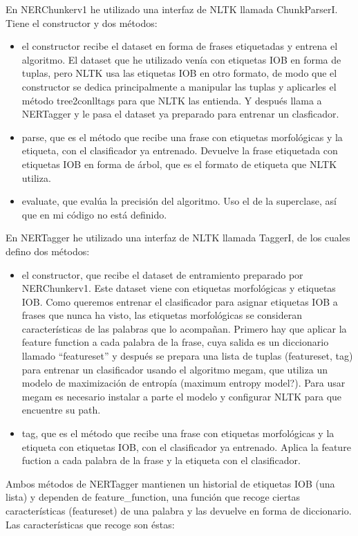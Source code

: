 \documentclass{pre-tfg}
\begin{document}
En NERChunkerv1 he utilizado una interfaz de NLTK llamada ChunkParserI. Tiene el constructor y dos métodos:
\begin{itemize}
	\item el constructor recibe el dataset en forma de frases etiquetadas y entrena el algoritmo. El dataset que he utilizado venía con etiquetas IOB en forma de tuplas, pero NLTK usa las etiquetas IOB en otro formato, de modo que el constructor se dedica principalmente a manipular las tuplas y aplicarles el método tree2conlltags para que NLTK las entienda. Y después llama a NERTagger y le pasa el dataset ya preparado para entrenar un clasficador.
	\item parse, que es el método que recibe una frase con etiquetas morfológicas y la etiqueta, con el clasificador ya entrenado. Devuelve la frase etiquetada con etiquetas IOB en forma de árbol, que es el formato de etiqueta que NLTK utiliza.
	\item evaluate, que evalúa la precisión del algoritmo. Uso el de la superclase, así que en mi código no está definido.
\end{itemize}


En NERTagger he utilizado una interfaz de NLTK llamada TaggerI, de los cuales defino dos métodos:

\begin{itemize}
	\item el constructor, que recibe el dataset de entramiento preparado por NERChunkerv1. Este dataset viene con etiquetas morfológicas y etiquetas IOB. Como queremos entrenar el clasificador para asignar etiquetas IOB a frases que nunca ha visto, las etiquetas morfológicas se consideran características de las palabras que lo acompañan. Primero hay que aplicar la feature function a cada palabra de la frase, cuya salida es un diccionario llamado “featureset” y después se prepara una lista de tuplas (featureset, tag) para entrenar un clasificador usando el algoritmo megam, que utiliza un modelo de maximización de entropía (maximum entropy model?). Para usar megam es necesario instalar a parte el modelo y configurar NLTK para que encuentre su path.
	\item tag, que es el método que recibe una frase con etiquetas morfológicas y la etiqueta con etiquetas IOB, con el clasificador ya entrenado. Aplica la feature fuction a cada palabra de la frase y la etiqueta con el clasificador.
\end{itemize}

Ambos métodos de NERTagger mantienen un historial de etiquetas IOB (una lista) y dependen de feature\_function, una función que recoge ciertas características (featureset) de una palabra y las devuelve en forma de diccionario. Las características que recoge son éstas:
\end{document}

